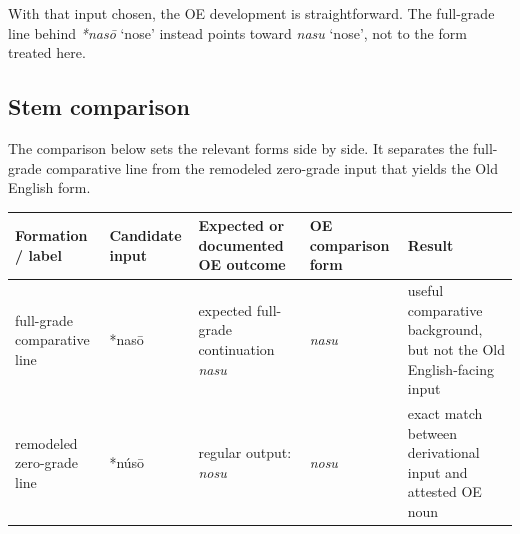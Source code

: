 \documentclass[
  british,
  a4paper,
  openany]{book}
\newcounter{none} %
\providecommand{\Recon}[1]{\emph{*#1}}
{\catcode`→=\active \global\def→{\ensuremath{\rightarrow}}}
\providecommand{\Recon}[1]{\emph{*#1}}
{\catcode`→=\active \global\def→{\ensuremath{\rightarrow}}}
\begin{document}
With that input chosen, the OE development is straightforward. The
full-grade line behind \Recon{nasō} `nose' instead points toward
{\emph{nasu}} `nose', not to the form treated here.

\subsection{Stem comparison}\label{stem-comparison-4}

The comparison below sets the relevant forms side by side. It separates
the full-grade comparative line from the remodeled zero-grade input that
yields the Old English form.

{\def\LTcaptype{none} %
\begin{longtable}[]{@{}
  >{\raggedright\arraybackslash}p{}
  >{\raggedright\arraybackslash}p{}
  >{\raggedright\arraybackslash}p{}
  >{\raggedright\arraybackslash}p{}
  >{\raggedright\arraybackslash}p{}@{}}
\toprule\noalign{}
\begin{minipage}[b]{\linewidth}\raggedright
Formation / label
\end{minipage} & \begin{minipage}[b]{\linewidth}\raggedright
Candidate input
\end{minipage} & \begin{minipage}[b]{\linewidth}\raggedright
Expected or documented OE outcome
\end{minipage} & \begin{minipage}[b]{\linewidth}\raggedright
OE comparison form
\end{minipage} & \begin{minipage}[b]{\linewidth}\raggedright
Result
\end{minipage} \\
\midrule\noalign{}
\endhead
\bottomrule\noalign{}
\endlastfoot
full-grade comparative line & *nasō & expected full-grade continuation
\emph{nasu} & \emph{nasu} & useful comparative background, but not the
Old English-facing input \\
remodeled zero-grade line & *núsō & regular output: \emph{nosu} &
\emph{nosu} & exact match between derivational input and attested OE
noun \\
\end{longtable}
}
\end{document}
